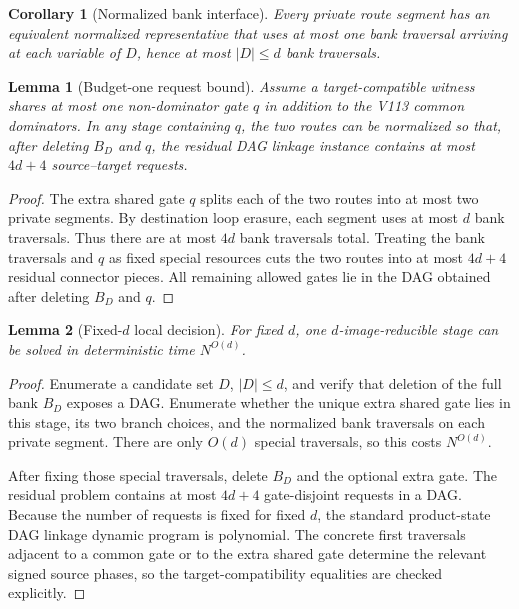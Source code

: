 \documentclass[11pt]{article}
\newtheorem{lemma}{Lemma}
\newtheorem{corollary}{Corollary}
\begin{document}
\begin{corollary}[Normalized bank interface]
Every private route segment has an equivalent normalized representative that uses at most one bank traversal arriving at each variable of $D$, hence at most $|D|\le d$ bank traversals.
\end{corollary}

\begin{lemma}[Budget-one request bound]
Assume a target-compatible witness shares at most one non-dominator gate $q$ in addition to the V113 common dominators.  In any stage containing $q$, the two routes can be normalized so that, after deleting $B_D$ and $q$, the residual DAG linkage instance contains at most $4d+4$ source--target requests.
\end{lemma}

\begin{proof}
The extra shared gate $q$ splits each of the two routes into at most two private segments.  By destination loop erasure, each segment uses at most $d$ bank traversals.  Thus there are at most $4d$ bank traversals total.  Treating the bank traversals and $q$ as fixed special resources cuts the two routes into at most $4d+4$ residual connector pieces.  All remaining allowed gates lie in the DAG obtained after deleting $B_D$ and $q$.
\end{proof}

\begin{lemma}[Fixed-$d$ local decision]
For fixed $d$, one $d$-image-reducible stage can be solved in deterministic time $N^{O(d)}$.
\end{lemma}

\begin{proof}
Enumerate a candidate set $D$, $|D|\le d$, and verify that deletion of the full bank $B_D$ exposes a DAG.  Enumerate whether the unique extra shared gate lies in this stage, its two branch choices, and the normalized bank traversals on each private segment.  There are only $O(d)$ special traversals, so this costs $N^{O(d)}$.

After fixing those special traversals, delete $B_D$ and the optional extra gate.  The residual problem contains at most $4d+4$ gate-disjoint requests in a DAG.  Because the number of requests is fixed for fixed $d$, the standard product-state DAG linkage dynamic program is polynomial.  The concrete first traversals adjacent to a common gate or to the extra shared gate determine the relevant signed source phases, so the target-compatibility equalities are checked explicitly.
\end{proof}
\end{document}
